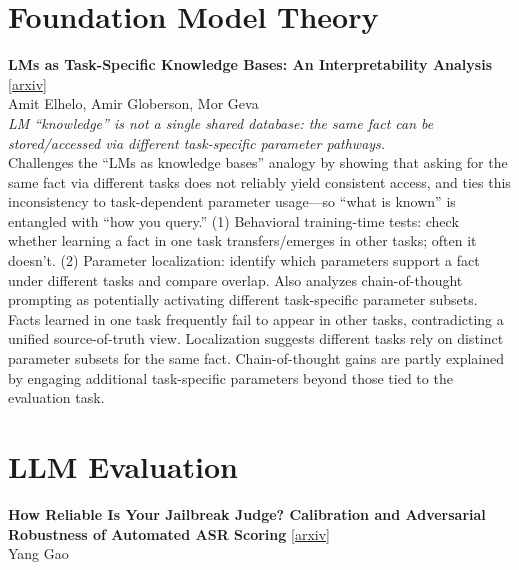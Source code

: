\documentclass[12pt,letterpaper]{article}
\begin{document}
\medskip


\section*{Foundation Model Theory}

{\small\textbf{LMs as Task-Specific Knowledge Bases: An Interpretability Analysis}} {\scriptsize[\href{https://arxiv.org/abs/2606.27237}{arxiv}]}\\
{\scriptsize Amit Elhelo, Amir Globerson, Mor Geva}\\

{\small\textit{LM ``knowledge'' is not a single shared database: the same fact can be stored/accessed via different task-specific parameter pathways.}}\\[1pt]
{\footnotesize Challenges the ``LMs as knowledge bases'' analogy by showing that asking for the same fact via different tasks does not reliably yield consistent access, and ties this inconsistency to task-dependent parameter usage---so ``what is known'' is entangled with ``how you query.'' (1) Behavioral training-time tests: check whether learning a fact in one task transfers/emerges in other tasks; often it doesn't. (2) Parameter localization: identify which parameters support a fact under different tasks and compare overlap. Also analyzes chain-of-thought prompting as potentially activating different task-specific parameter subsets. Facts learned in one task frequently fail to appear in other tasks, contradicting a unified source-of-truth view. Localization suggests different tasks rely on distinct parameter subsets for the same fact. Chain-of-thought gains are partly explained by engaging additional task-specific parameters beyond those tied to the evaluation task.}

\medskip


\section*{LLM Evaluation}

{\small\textbf{How Reliable Is Your Jailbreak Judge? Calibration and Adversarial Robustness of Automated ASR Scoring}} {\scriptsize[\href{https://arxiv.org/abs/2606.25487}{arxiv}]}\\
{\scriptsize Yang Gao}\\
\end{document}
